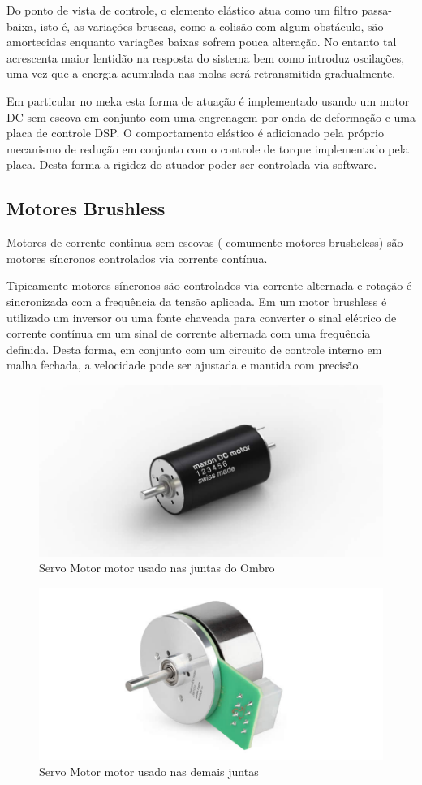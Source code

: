 Do ponto de vista de controle, o elemento elástico atua como um filtro passa-baixa, isto é, as variações bruscas, como a colisão com algum obstáculo, são amortecidas enquanto variações baixas sofrem pouca alteração. No entanto tal acrescenta maior lentidão na resposta do sistema bem como introduz oscilações, uma vez que a energia acumulada nas molas será retransmitida gradualmente.


Em particular no meka esta forma de atuação é implementado usando um motor DC sem escova em conjunto com uma engrenagem por onda de deformação e uma placa de controle DSP. O comportamento elástico é adicionado pela próprio mecanismo de redução em conjunto com o controle de torque implementado pela placa. Desta forma a rigidez do atuador poder ser controlada via software.

\subsection{Motores Brushless}

Motores de corrente continua sem escovas ( comumente motores brusheless) são motores síncronos controlados via corrente contínua.

Tipicamente motores síncronos são controlados via corrente alternada e rotação é sincronizada com a frequência da tensão aplicada. Em um motor brushless é utilizado um inversor ou uma fonte chaveada para converter o sinal elétrico de corrente contínua em um sinal de corrente alternada com uma frequência definida. Desta forma, em conjunto com um circuito de controle interno em malha fechada, a velocidade pode ser ajustada e mantida com precisão. \cite{nobody}

\begin{figure}[H]
    \centering
    \includegraphics[width = 0.6\linewidth]{figs/maxon_servo.jpg}
    \caption{Servo Motor motor usado nas juntas do Ombro}
    \label{fig:maxon-servo}
\end{figure}

\begin{figure}[H]
    \centering
    \includegraphics[width = 0.6\linewidth]{figs/maxon_flat_servo.jpg}
    \caption{Servo Motor motor usado nas demais juntas}
    \label{fig:maxon-flat-servo}
\end{figure}

